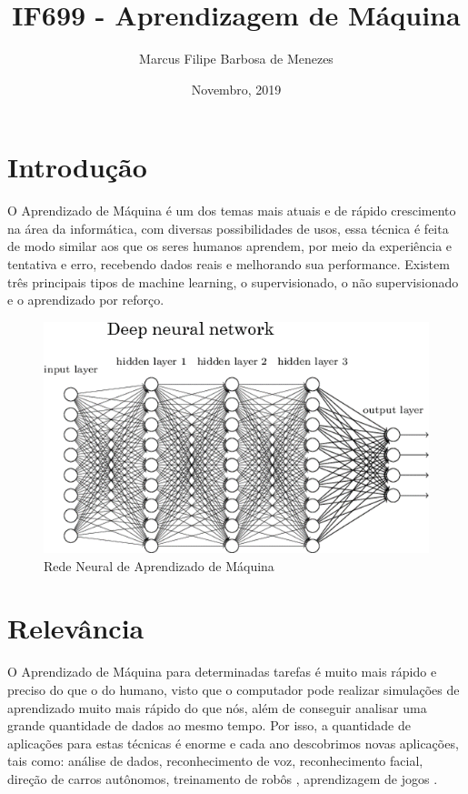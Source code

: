 \documentclass{article}
\title{IF699 - Aprendizagem de Máquina}
\author{Marcus Filipe Barbosa de Menezes}
\date{Novembro, 2019}
\begin{document}
\maketitle

\section{Introdução}
O Aprendizado de Máquina é um dos temas mais atuais e de rápido crescimento na área da informática, com diversas possibilidades de usos, essa técnica é feita de modo similar aos que os seres humanos aprendem, por meio da experiência e tentativa e erro, recebendo dados reais e melhorando sua performance. Existem três principais tipos de machine learning, o supervisionado, o não supervisionado e o aprendizado por reforço.\cite{3machinelearning}

\begin{figure}[h!]
\centering
\includegraphics[scale=0.8]{neuralnetwork.png}
\caption{Rede Neural de Aprendizado de Máquina}
\label{fig:Neural Network}
\end{figure}

\section{Relevância}O Aprendizado de Máquina para determinadas tarefas é muito mais rápido e preciso do que o do humano, visto que o computador pode realizar simulações de aprendizado muito mais rápido do que nós, além de conseguir analisar uma grande quantidade de dados ao mesmo tempo. Por isso, a quantidade de aplicações para estas técnicas é enorme e cada ano descobrimos novas aplicações, tais como: análise de dados, reconhecimento de voz, reconhecimento facial, direção de carros autônomos\cite{tesla}, treinamento de robôs \cite{robocin}, aprendizagem de jogos \cite{alphago}.
\end{document}
